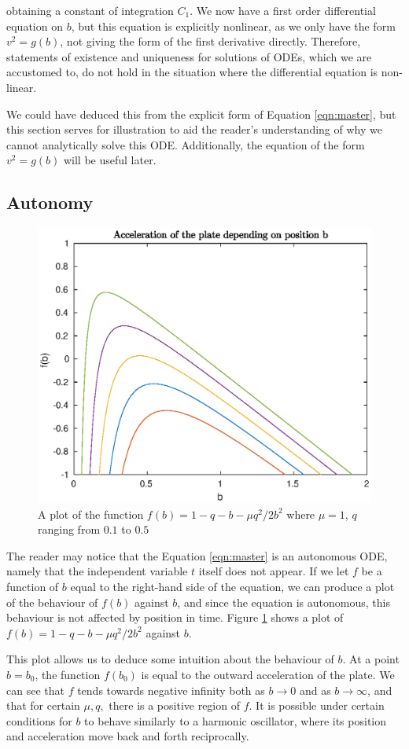 \documentclass{article}
\begin{document}
obtaining a constant of integration $C_1$.
We now have a first order differential equation on $b$, %
but this equation is explicitly nonlinear, as we only have the form $v^2 = g(b)$,
not giving the form of the first derivative directly.
Therefore, statements of existence and uniqueness for solutions of ODEs,
which we are accustomed to,
do not hold in the situation where the differential equation is non-linear.

We could have deduced this from the explicit form of Equation \ref{eqn:master},
but this section serves for illustration to aid the reader's understanding of why we cannot analytically solve this ODE.
Additionally, the equation of the form $v^2 = g(b)$ will be useful later.

\subsection{Autonomy}

\begin{figure}
    \centering
    \includegraphics[width=0.5\linewidth]{f_plot_mu_1_q_vary}
    \caption{A plot of the function $f(b) = 1-q-b-\mu q^2/2b^2$ where $\mu=1$, $q$ ranging from $0.1$ to $0.5$}
    \label{fig:acc_b_plot}
\end{figure}

The reader may notice that the Equation \ref{eqn:master} is an autonomous ODE,
namely that the independent variable $t$ itself does not appear.
If we let $f$ be a function of $b$ equal to the right-hand side of the equation,
we can produce a plot of the behaviour of $f(b)$ against $b$,
and since the equation is autonomous, this behaviour is not affected by position in time.
Figure \ref{fig:acc_b_plot} shows a plot of $f(b)= 1 - q - b - \mu q^2/2b^2$ against $b$.

This plot allows us to deduce some intuition about the behaviour of $b$.
At a point $b=b_0$, the function $f(b_0)$ is equal to the outward acceleration of the plate.
We can see that $f$ tends towards negative infinity both as $b\rightarrow 0$ and as $b\rightarrow\infty$,
and that for certain $\mu, q,$ there is a positive region of $f$.
It is possible under certain conditions for $b$ to behave similarly to a harmonic oscillator,
where its position and acceleration move back and forth reciprocally.
\end{document}
